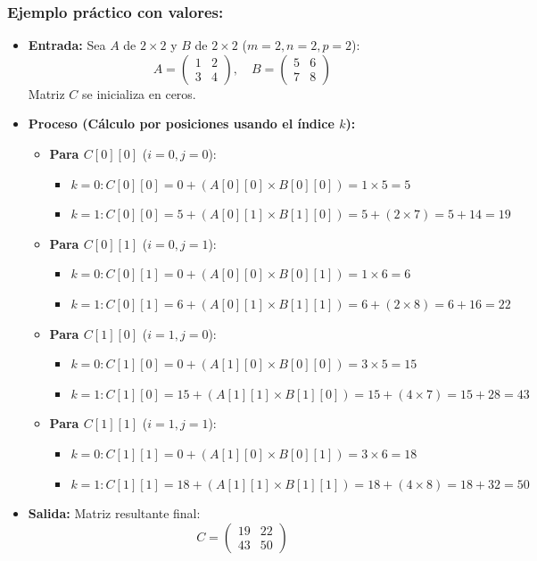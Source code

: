 \documentclass[12pt]{article}
\begin{document}
\subsubsection*{Ejemplo práctico con valores:}
\begin{itemize}
    \item \textbf{Entrada:} Sea $A$ de $2 \times 2$ y $B$ de $2 \times 2$ ($m=2, n=2, p=2$):
    \[ A = \begin{pmatrix} 1 & 2 \\ 3 & 4 \end{pmatrix}, \quad B = \begin{pmatrix} 5 & 6 \\ 7 & 8 \end{pmatrix} \]
    Matriz $C$ se inicializa en ceros.
    \item \textbf{Proceso (Cálculo por posiciones usando el índice $k$):}
    \begin{itemize}
        \item \textbf{Para $C[0][0]$} ($i=0, j=0$):
        \begin{itemize}
            \item $k=0: C[0][0] = 0 + (A[0][0] \times B[0][0]) = 1 \times 5 = 5$
            \item $k=1: C[0][0] = 5 + (A[0][1] \times B[1][0]) = 5 + (2 \times 7) = 5 + 14 = 19$
        \end{itemize}
        \item \textbf{Para $C[0][1]$} ($i=0, j=1$):
        \begin{itemize}
            \item $k=0: C[0][1] = 0 + (A[0][0] \times B[0][1]) = 1 \times 6 = 6$
            \item $k=1: C[0][1] = 6 + (A[0][1] \times B[1][1]) = 6 + (2 \times 8) = 6 + 16 = 22$
        \end{itemize}
        \item \textbf{Para $C[1][0]$} ($i=1, j=0$):
        \begin{itemize}
            \item $k=0: C[1][0] = 0 + (A[1][0] \times B[0][0]) = 3 \times 5 = 15$
            \item $k=1: C[1][0] = 15 + (A[1][1] \times B[1][0]) = 15 + (4 \times 7) = 15 + 28 = 43$
        \end{itemize}
        \item \textbf{Para $C[1][1]$} ($i=1, j=1$):
        \begin{itemize}
            \item $k=0: C[1][1] = 0 + (A[1][0] \times B[0][1]) = 3 \times 6 = 18$
            \item $k=1: C[1][1] = 18 + (A[1][1] \times B[1][1]) = 18 + (4 \times 8) = 18 + 32 = 50$
        \end{itemize}
    \end{itemize}
    \item \textbf{Salida:} Matriz resultante final:
    \[ C = \begin{pmatrix} 19 & 22 \\ 43 & 50 \end{pmatrix} \]
\end{itemize}
\end{document}
